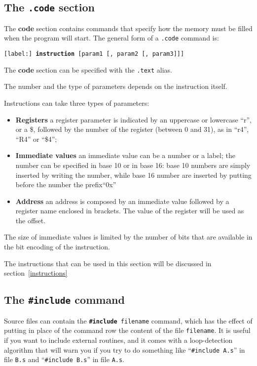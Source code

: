 \documentclass[12pt]{report}
\begin{document}
\subsection{The \texttt{.code} section}
The \textbf{code} section contains commands that specify how the memory must be
filled when the program will start. The general form of a \texttt{.code} command
is:

\begin{center}
	\texttt{[label:] \textbf{instruction} [param1 [, param2 [, param3]]]}
\end{center}

The \textbf{code} section can be specified with the \texttt{.text} alias.

The number and the type of parameters depends on the instruction itself.

Instructions can take three types of parameters:
\begin{itemize}
	\item \textbf{Registers} a register parameter is indicated by an uppercase
    or lowercase ``r'', or a \$, followed by the number of the register (between
	0 and 31), as in ``r4'', ``R4'' or ``\$4'';
	\item \textbf{Immediate values} an immediate value can be a number or a
	label; the number can be specified in base 10 or in base 16: base 10 numbers
	are simply inserted by writing the number, while base 16 number are inserted
	by putting before the number the prefix``0x''
	\item \textbf{Address} an address is composed by an immediate value followed
	by a register name enclosed in brackets. The value of the register will be 
	used as the offset.
\end{itemize}

The size of immediate values is limited by the number of bits that are available
in the bit encoding of the instruction. 


The instructions that can be used in this section will be discussed in
section~\ref{instructions}

\subsection{The \texttt{\#include} command}
Source files can contain the \texttt{\textbf{\#include} filename} command, which has the
effect of putting in place of the command row the content of the file
\texttt{filename}.
It is useful if you want to include external routines, and it comes with a
loop-detection algorithm that will warn you if you try to do something like
``\texttt{\#include A.s}'' in file \texttt{B.s} and ``\texttt{\#include B.s}'' in
file \texttt{A.s}.
\end{document}
